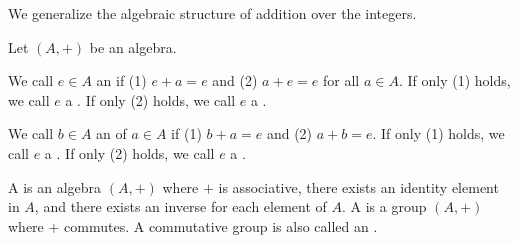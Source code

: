
\sbasic



\sstart



We generalize the algebraic structure of addition over the integers.


Let $(A, +)$ be an algebra.

We call $e \in A$ an  if
(1) $e + a = e$ and (2) $a + e = e$ for all $a \in A$.
If only (1) holds, we call $e$ a .
If only (2) holds, we call $e$ a .

We call $b \in A$ an  of $a \in A$
if (1) $b + a = e$ and (2) $a + b = e$.
If only (1) holds, we call $e$ a .
If only (2) holds, we call $e$ a .

A  is an algebra $(A, +)$ where
$+$ is associative,
there exists an identity element in $A$, and
there exists an inverse for each element of $A$.
A  is a group $(A, +)$ where $+$ commutes.
A commutative group is also called an .



\strats
